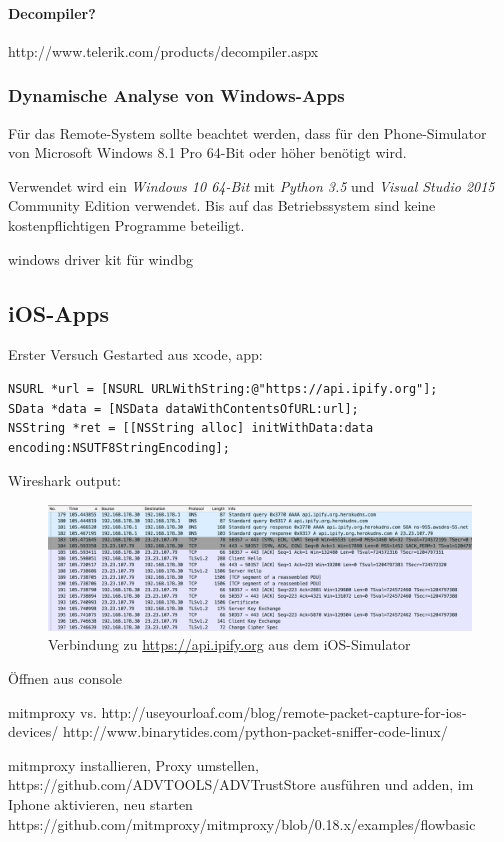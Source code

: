 \paragraph{Decompiler?}
http://www.telerik.com/products/decompiler.aspx


\subsubsection{Dynamische Analyse von Windows-Apps}
Für das Remote-System sollte beachtet werden, dass für den Phone-Simulator von Microsoft Windows 8.1 Pro 64-Bit oder höher benötigt wird.

Verwendet wird ein \textit{Windows 10 64-Bit} mit \textit{Python 3.5} und \textit{Visual Studio 2015} Community Edition verwendet. Bis auf das Betriebssystem sind keine kostenpflichtigen Programme beteiligt.

windows driver kit für windbg

\subsection{iOS-Apps}
Erster Versuch
Gestarted aus xcode, app:
\begin{lstlisting}
NSURL *url = [NSURL URLWithString:@"https://api.ipify.org"];
SData *data = [NSData dataWithContentsOfURL:url];
NSString *ret = [[NSString alloc] initWithData:data encoding:NSUTF8StringEncoding];
\end{lstlisting}
Wireshark output:
\begin{figure}[htbp]
	\centering
	\includegraphics[width=\textwidth]{bilder/pentest_mobile_anwendungen/weiterentw_mobsf/wireshark_simulator.png}
	\caption{Verbindung zu \url{https://api.ipify.org} aus dem iOS-Simulator}
	\label{fig:VergleichLLDBImages}
\end{figure}

Öffnen aus console

mitmproxy vs. http://useyourloaf.com/blog/remote-packet-capture-for-ios-devices/
http://www.binarytides.com/python-packet-sniffer-code-linux/

mitmproxy installieren, Proxy umstellen, https://github.com/ADVTOOLS/ADVTrustStore ausführen und adden, im Iphone aktivieren, neu starten
https://github.com/mitmproxy/mitmproxy/blob/0.18.x/examples/flowbasic

